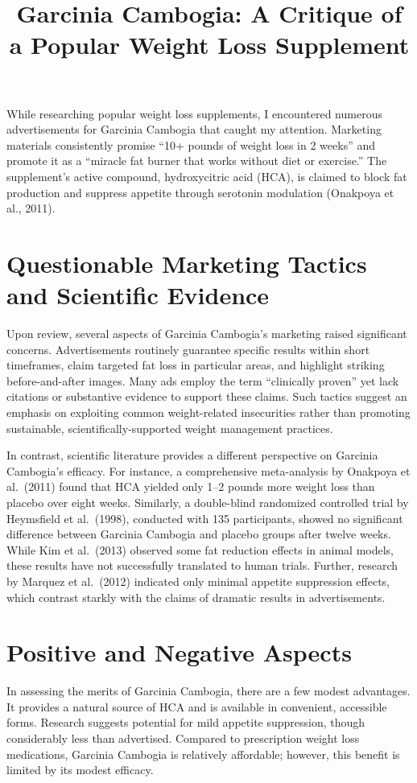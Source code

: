 \documentclass[12pt]{article}
\title{Garcinia Cambogia: A Critique of a Popular Weight Loss Supplement}
\author{}
\date{}
\begin{document}
\maketitle
\doublespacing
\vspace{-5em}

While researching popular weight loss supplements, I encountered numerous advertisements for Garcinia Cambogia that caught my attention. Marketing materials consistently promise ``10+ pounds of weight loss in 2 weeks'' and promote it as a ``miracle fat burner that works without diet or exercise.'' The supplement's active compound, hydroxycitric acid (HCA), is claimed to block fat production and suppress appetite through serotonin modulation (Onakpoya et al., 2011).

\section*{Questionable Marketing Tactics and Scientific Evidence}
Upon review, several aspects of Garcinia Cambogia's marketing raised significant concerns. Advertisements routinely guarantee specific results within short timeframes, claim targeted fat loss in particular areas, and highlight striking before-and-after images. Many ads employ the term ``clinically proven'' yet lack citations or substantive evidence to support these claims. Such tactics suggest an emphasis on exploiting common weight-related insecurities rather than promoting sustainable, scientifically-supported weight management practices.

In contrast, scientific literature provides a different perspective on Garcinia Cambogia's efficacy. For instance, a comprehensive meta-analysis by Onakpoya et al.\ (2011) found that HCA yielded only 1--2 pounds more weight loss than placebo over eight weeks. Similarly, a double-blind randomized controlled trial by Heymsfield et al.\ (1998), conducted with 135 participants, showed no significant difference between Garcinia Cambogia and placebo groups after twelve weeks. While Kim et al.\ (2013) observed some fat reduction effects in animal models, these results have not successfully translated to human trials. Further, research by Marquez et al.\ (2012) indicated only minimal appetite suppression effects, which contrast starkly with the claims of dramatic results in advertisements.

\section*{Positive and Negative Aspects}
In assessing the merits of Garcinia Cambogia, there are a few modest advantages. It provides a natural source of HCA and is available in convenient, accessible forms. Research suggests potential for mild appetite suppression, though considerably less than advertised. Compared to prescription weight loss medications, Garcinia Cambogia is relatively affordable; however, this benefit is limited by its modest efficacy.
\end{document}

